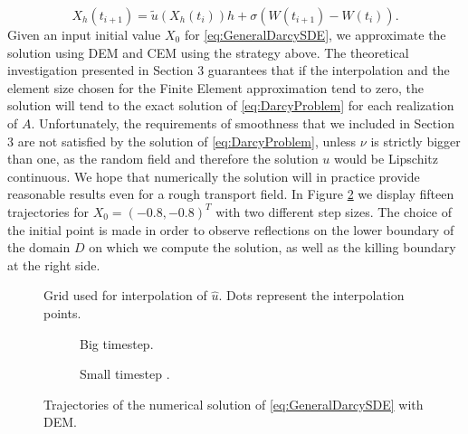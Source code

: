 \begin{equation}\label{eq:DEMDarcy}
	X_h(t_{i+1}) = \tilde{u}(X_h(t_i)) h + \sigma (W(t_{i+1}) - W(t_i)).
\end{equation}
Given an input initial value $X_0$ for \eqref{eq:GeneralDarcySDE}, we approximate the solution using DEM and CEM using the strategy above. The theoretical investigation presented in Section 3 guarantees that if the interpolation and the element size chosen for the Finite Element approximation tend to zero, the solution will tend to the exact solution of \eqref{eq:DarcyProblem} for each realization of $A$. Unfortunately, the requirements of smoothness that we included in Section 3 are not satisfied by the solution of \eqref{eq:DarcyProblem}, unless $\nu$ is strictly bigger than one, as the random field and therefore the solution $u$ would be Lipschitz continuous. We hope that numerically the solution will in practice provide reasonable results even for a rough transport field. In Figure \ref{fig:TrajSDEDarcy} we display fifteen trajectories for $X_0 = (-0.8,-0.8)^T$ with two different step sizes. The choice of the initial point is made in order to observe reflections on the lower boundary of the domain $D$ on which we compute the solution, as well as the killing boundary at the right side. 

\begin{figure}[t]
    \centering
    \resizebox{0.6\linewidth}{!}{ }  
    \caption{Grid used for interpolation of $\hat{u}$. Dots represent the interpolation points.}
    \label{fig:GridVelocity}
\end{figure}

\begin{figure}[t]
    \centering
    \begin{subfigure}{0.49\linewidth}
        \centering
        \resizebox{1\linewidth}{!}{ }  
        \caption{Big timestep.}
    \end{subfigure}
    \begin{subfigure}{0.49\linewidth}
        \centering
        \resizebox{1\linewidth}{!}{ }  
        \caption{Small timestep .}
    \end{subfigure}    
    \caption{Trajectories of the numerical solution of \eqref{eq:GeneralDarcySDE} with DEM.}
    \label{fig:TrajSDEDarcy}
\end{figure}

